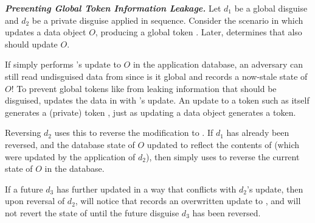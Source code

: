 \vspace{6pt}\noindent\textbf{\emph{Preventing Global Token Information Leakage.}}
%
Let $d_1$ be a global disguise and $d_2$ be a private disguise applied in sequence.  Consider the
scenario in which  updates a data object $O$, producing a global token . Later,
\sys determines that  also should update $O$.

If \sys simply performs 's update to $O$ in the application database, an adversary can still
read undisguised data from  since is it global and records a now-stale state of $O$!
%
%
To prevent global tokens like  from leaking information that should be disguised, \sys
updates the data in  with 's update. An update to a token such as 
itself generates a (private) token , just as updating a data object generates a token.

Reversing $d_2$ uses this  to reverse the modification to . 
If $d_1$ has already been reversed, and the database state of $O$ updated to reflect the contents
of  (which were updated by the application of $d_2$), 
then \sys simply uses  to reverse the current state of $O$ in the database. 

If a future $d_3$ has further updated  in a way that conflicts with $d_2$'s update, then
upon reversal of $d_2$, \sys will notice that  records an overwritten update to
, and will not revert the state of  until the future disguise $d_3$ has been
reversed.




